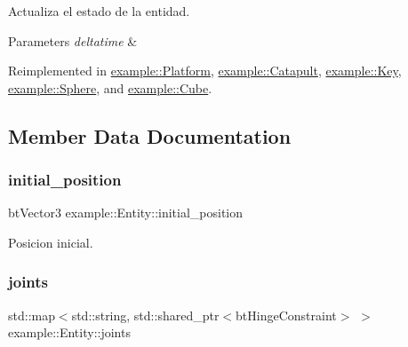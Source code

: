Actualiza el estado de la entidad. 


\begin{DoxyParams}{Parameters}
{\em deltatime} & \\
\hline
\end{DoxyParams}


Reimplemented in \mbox{\hyperlink{classexample_1_1_platform_a6e8de925951062be87fe836934b4a634}{example\+::\+Platform}}, \mbox{\hyperlink{classexample_1_1_catapult_a92d07b886ef107a18037b53476c27f69}{example\+::\+Catapult}}, \mbox{\hyperlink{classexample_1_1_key_ac462e54ccbfec9767a2def808ff6c198}{example\+::\+Key}}, \mbox{\hyperlink{classexample_1_1_sphere_a68d6efb4ed4119ddd93570ca689b3d23}{example\+::\+Sphere}}, and \mbox{\hyperlink{classexample_1_1_cube_a16f3dba5c798aa09c8548e7d8d033b25}{example\+::\+Cube}}.



\subsection{Member Data Documentation}
\mbox{\label{classexample_1_1_entity_a2b0441f54efe4182501abf0fe40d0f16}} 
\subsubsection{\texorpdfstring{initial\_position}{initial\_position}}
{\footnotesize\ttfamily bt\+Vector3 example\+::\+Entity\+::initial\+\_\+position\hspace{0.3cm}{\ttfamily [protected]}}



Posicion inicial. 

\mbox{\label{classexample_1_1_entity_ad553e808e658d2884ede11c5a328865d}} 
\subsubsection{\texorpdfstring{joints}{joints}}
{\footnotesize\ttfamily std\+::map$<$std\+::string, std\+::shared\+\_\+ptr$<$bt\+Hinge\+Constraint$>$ $>$ example\+::\+Entity\+::joints\hspace{0.3cm}{\ttfamily [protected]}}



